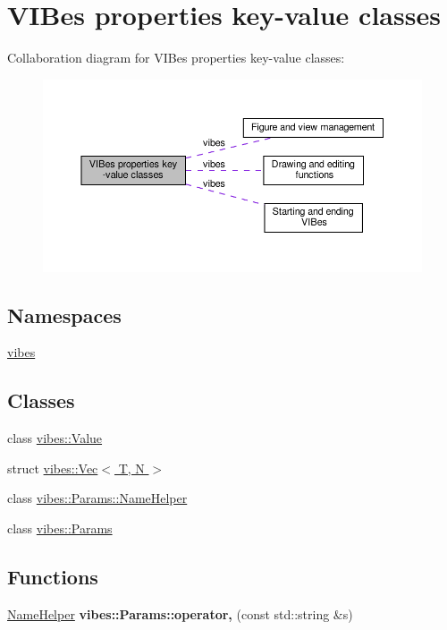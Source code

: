 \hypertarget{group__params}{}\section{V\+I\+Bes properties key-\/value classes}
\label{group__params}
Collaboration diagram for V\+I\+Bes properties key-\/value classes\+:\nopagebreak
\begin{figure}[H]
\begin{center}
\leavevmode
\includegraphics[width=350pt]{group__params}
\end{center}
\end{figure}
\subsection*{Namespaces}
\begin{DoxyCompactItemize}
\item 
 \hyperlink{namespacevibes}{vibes}
\end{DoxyCompactItemize}
\subsection*{Classes}
\begin{DoxyCompactItemize}
\item 
class \hyperlink{classvibes_1_1_value}{vibes\+::\+Value}
\item 
struct \hyperlink{structvibes_1_1_vec}{vibes\+::\+Vec$<$ T, N $>$}
\item 
class \hyperlink{classvibes_1_1_params_1_1_name_helper}{vibes\+::\+Params\+::\+Name\+Helper}
\item 
class \hyperlink{classvibes_1_1_params}{vibes\+::\+Params}
\end{DoxyCompactItemize}
\subsection*{Functions}
\begin{DoxyCompactItemize}
\item 
\mbox{\label{group__params_gad3a42d305403316fcbf1ec15bf00a0f4}} 
\hyperlink{classvibes_1_1_params_1_1_name_helper}{Name\+Helper} {\bfseries vibes\+::\+Params\+::operator,} (const std\+::string \&s)
\end{DoxyCompactItemize}

